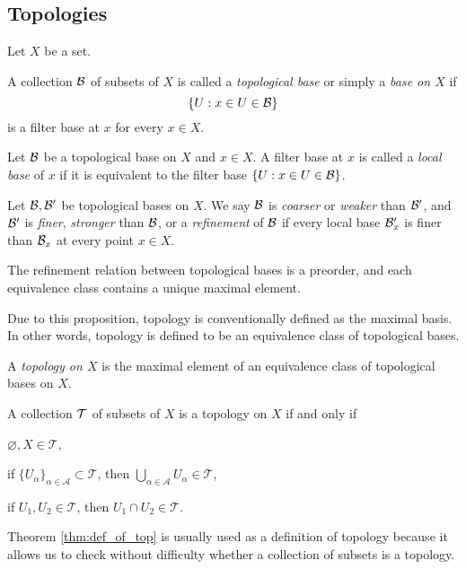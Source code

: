 \documentclass{../crs}
\begin{document}
\subsection{Topologies}

Let $X$ be a set.
\begin{defn}
A collection $\mathcal{B}$ of subsets of $X$ is called a \emph{topological base} or simply a \emph{base on $X$} if
\[\{U:x\in U\in\mathcal{B}\}\]
is a filter base at $x$ for every $x\in X$.
\end{defn}
\begin{defn}
Let $\mathcal{B}$ be a topological base on $X$ and $x\in X$.
A filter base at $x$ is called a \emph{local base} of $x$ if it is equivalent to the filter base $\{U:x\in U\in\mathcal{B}\}$.
\end{defn}
\begin{defn}
Let $\mathcal{B},\mathcal{B}'$ be topological bases on $X$.
We say $\mathcal{B}$ is \emph{coarser} or \emph{weaker} than $\mathcal{B}'$, and $\mathcal{B}'$ is \emph{finer}, \emph{stronger} than $\mathcal{B}$, or a \emph{refinement} of $\mathcal{B}$ if every local base $\mathcal{B}'_x$ is finer than $\mathcal{B}_x$ at every point $x\in X$.
\end{defn}
\begin{prop}
The refinement relation between topological bases is a preorder, and each equivalence class contains a unique maximal element.
\end{prop}
\begin{pf}

\end{pf}
Due to this proposition, topology is conventionally defined as the maximal basis.
In other words, topology is defined to be an equivalence class of topological bases.
\begin{defn}
A \emph{topology on $X$} is the maximal element of an equivalence class of topological bases on $X$.
\end{defn}
\begin{thm}\label{thm:def_of_top}
A collection $\mathcal{T}$ of subsets of $X$ is a topology on $X$ if and only if
\begin{cond}
\item $\varnothing,X\in\mathcal{T}$,
\item if $\{U_\alpha\}_{\alpha\in\mathcal{A}}\subset\mathcal{T}$, then $\bigcup_{\alpha\in\mathcal{A}}U_\alpha\in\mathcal{T}$,
\item if $U_1,U_2\in\mathcal{T}$, then $U_1\cap U_2\in\mathcal{T}$.
\end{cond}
\end{thm}
\begin{pf}

\end{pf}
Theorem \ref{thm:def_of_top} is usually used as a definition of topology because it allows us to check without difficulty whether a collection of subsets is a topology.
\end{document}

